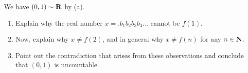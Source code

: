 \documentclass{lew98_solutions}
\begin{document}
\begin{solution}
    We have \( (0, 1) \sim \mathbf{R} \) by  (a).
\end{solution}

\begin{exercise}
\label{ex:1.6.2}
    \begin{enumerate}
        \item Explain why the real number \( x = .b_1 b_2 b_3 b_4 \ldots \) cannot be \( f(1) \).

        \item Now, explain why \( x \neq f(2) \), and in general why \( x \neq f(n) \) for any \( n \in \mathbf{N} \).

        \item Point out the contradiction that arises from these observations and conclude that \( (0, 1) \) is uncountable.
    \end{enumerate}
\end{exercise}
\end{document}
